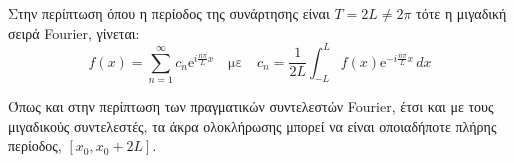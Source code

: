 \documentclass[a4paper,table]{report}
\begin{document}
\begin{rem}
  Στην περίπτωση όπου η περίοδος της συνάρτησης είναι $ T=2L \neq 2 \pi $ τότε 
  η μιγαδική σειρά \textlatin{Fourier}, γίνεται:
  \[
    f(x) = \sum_{n=1}^{\infty} c_{n} \mathrm{e}^{i \frac{n \pi}{L} x} \quad
    \text{με} \quad c_{n} = \frac{1}{2L} \int _{-L}^{L} f(x) \mathrm{e}^{-i
    \frac{n \pi}{L} x}
    \,{dx}  
  \]
\end{rem}

\begin{rem}
  Όπως και στην περίπτωση των πραγματικών συντελεστών \textlatin{Fourier}, έτσι και 
  με τους μιγαδικούς συντελεστές, τα άκρα ολοκλήρωσης μπορεί να είναι οποιαδήποτε 
  πλήρης περίοδος, $ [x_{0}, x_{0}+ 2L] $.
\end{rem}


\end{document}
